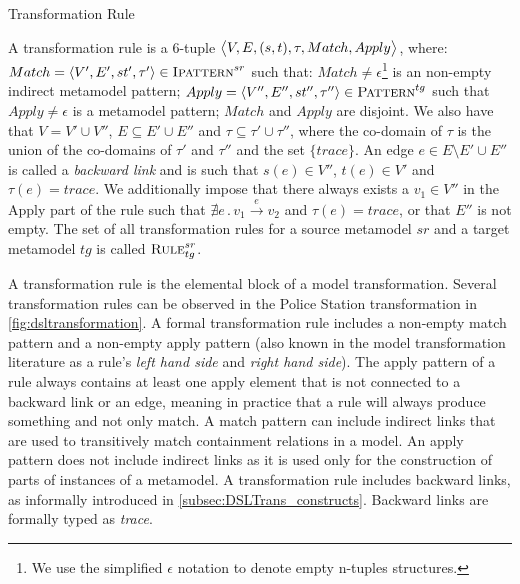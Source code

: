 \begin{definition}{Transformation Rule\\}
\label{def:transformation_rule}

A transformation rule is a 6-tuple $\big\langle V,E,(s,t),\tau, Match,\\Apply\big\rangle$, where: $Match=\langle V',E',st',\tau'\rangle\in \textsc{Ipattern}^{sr}$ such that: $Match\neq \epsilon$\footnote{We use the simplified $\epsilon$ notation to denote empty n-tuples structures.} is an non-empty indirect metamodel pattern; $Apply=\langle V'',E'',st'',\tau''\rangle\in \textsc{Pattern}^{tg}$ such that $Apply\neq\epsilon$ is a metamodel pattern; $Match$ and $Apply$ are disjoint. We also have that $V=V'\cup V''$, $E\subseteq E'\cup E''$ and $\tau\subseteq \tau'\cup \tau''$, where the co-domain of $\tau$ is the union of the co-domains of $\tau'$ and $\tau''$ and the set $\{trace\}$. An edge $e \in E\setminus E'\cup E''$ is called a \emph{backward link} and is such that $s(e)\in V''$, $t(e)\in V'$ and $\tau(e)=trace$. We additionally impose that there always exists a $v_1\in V''$ in the Apply part of the rule such that $\nexists e\,.\, v_1\xrightarrow{e} v_2$ and $\tau(e)=trace$, or that $E''$ is not empty. The set of all transformation rules for a source metamodel $sr$ and a target metamodel $tg$ is called $\textsc{Rule}^{sr}_{tg}$.

\end{definition}


A transformation rule is the elemental block of a model transformation. Several transformation rules can be observed in the Police Station transformation in \cref{fig:dsltransformation}. A formal transformation rule includes a non-empty match pattern and a non-empty apply pattern (also known in the model transformation literature as a rule's \emph{left hand side} and \emph{right hand side}). The apply pattern of a rule always contains at least one apply element that is not connected to a backward link or an edge, meaning in practice that a rule will always produce something and not only match. A match pattern can include indirect links that are used to transitively match containment relations in a model. An apply pattern does not include indirect links as it is used only for the construction of parts of instances of a metamodel. A transformation rule includes backward links, as informally introduced in \cref{subsec:DSLTrans_constructs}. Backward links are formally typed as \emph{trace}.%


